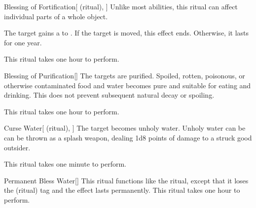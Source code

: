 \lowercase{\hypertarget{spell:Blessing of Fortification}{}}\label{spell:Blessing of Fortification}
\begin{attuneability}[Rank 1]{\hypertarget{spell:Blessing of Fortification}{Blessing of Fortification}}[ (ritual), ]
Unlike most abilities, this ritual can affect individual parts of a whole object.

The target gains a   to .
If the target is moved, this effect ends.
Otherwise, it lasts for one year.

This ritual takes one hour to perform.
\end{attuneability}
\vspace{0.25em}



\lowercase{\hypertarget{spell:Blessing of Purification}{}}\label{spell:Blessing of Purification}
\begin{apability}[Rank 1]{\hypertarget{spell:Blessing of Purification}{Blessing of Purification}}[]
The targets are purified.
Spoiled, rotten, poisonous, or otherwise contaminated food and water becomes pure and suitable for eating and drinking.
This does not prevent subsequent natural decay or spoiling.

This ritual takes one hour to perform.
\end{apability}
\vspace{0.25em}



\lowercase{\hypertarget{spell:Curse Water}{}}\label{spell:Curse Water}
\begin{attuneability}[Rank 1]{\hypertarget{spell:Curse Water}{Curse Water}}[ (ritual), ]
The target becomes unholy water.
Unholy water can be can be thrown as a splash weapon, dealing 1d8 points of damage to a struck good outsider.

This ritual takes one minute to perform.
\end{attuneability}
\vspace{0.25em}



\lowercase{\hypertarget{spell:Permanent Bless Water}{}}\label{spell:Permanent Bless Water}
\begin{apability}[Rank 3]{\hypertarget{spell:Permanent Bless Water}{Permanent Bless Water}}[]
This ritual functions like the  ritual, except that it loses the  (ritual) tag and the effect lasts permanently.
This ritual takes one hour to perform.
\end{apability}
\vspace{0.25em}



